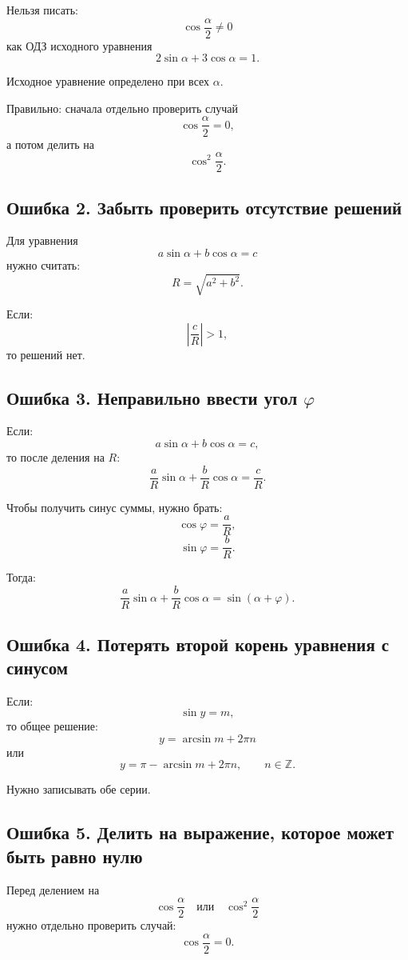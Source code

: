 \documentclass[a4paper,12pt]{article}
\begin{document}
Нельзя писать:
\[
\cos\frac{\alpha}{2}\ne0
\]
как ОДЗ исходного уравнения
\[
2\sin\alpha+3\cos\alpha=1.
\]

Исходное уравнение определено при всех \(\alpha\).

Правильно: сначала отдельно проверить случай
\[
\cos\frac{\alpha}{2}=0,
\]
а потом делить на
\[
\cos^2\frac{\alpha}{2}.
\]

\subsection*{Ошибка 2. Забыть проверить отсутствие решений}

Для уравнения
\[
a\sin\alpha+b\cos\alpha=c
\]
нужно считать:
\[
R=\sqrt{a^2+b^2}.
\]

Если:
\[
\left|\frac{c}{R}\right|>1,
\]
то решений нет.

\subsection*{Ошибка 3. Неправильно ввести угол \(\varphi\)}

Если:
\[
a\sin\alpha+b\cos\alpha=c,
\]
то после деления на \(R\):
\[
\frac{a}{R}\sin\alpha+\frac{b}{R}\cos\alpha=\frac{c}{R}.
\]

Чтобы получить синус суммы, нужно брать:
\[
\cos\varphi=\frac{a}{R},
\]
\[
\sin\varphi=\frac{b}{R}.
\]

Тогда:
\[
\frac{a}{R}\sin\alpha+\frac{b}{R}\cos\alpha
=
\sin(\alpha+\varphi).
\]

\subsection*{Ошибка 4. Потерять второй корень уравнения с синусом}

Если:
\[
\sin y=m,
\]
то общее решение:
\[
y=\arcsin m+2\pi n
\]
или
\[
y=\pi-\arcsin m+2\pi n,
\qquad n\in\mathbb Z.
\]

Нужно записывать обе серии.

\subsection*{Ошибка 5. Делить на выражение, которое может быть равно нулю}

Перед делением на
\[
\cos\frac{\alpha}{2}
\quad \text{или} \quad
\cos^2\frac{\alpha}{2}
\]
нужно отдельно проверить случай:
\[
\cos\frac{\alpha}{2}=0.
\]

\newpage
\end{document}
